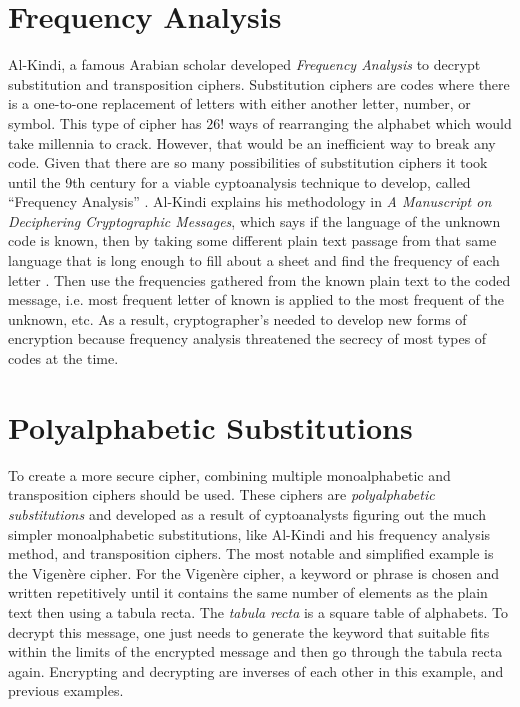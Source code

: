 \documentclass[12pt,letterpaper]{article} %
\begin{document}
\section{Frequency Analysis}
Al-Kindi, a famous Arabian scholar developed \emph{Frequency Analysis} to decrypt substitution and transposition ciphers.  Substitution ciphers are codes where 
there is a one-to-one replacement of letters with either another letter, number, or symbol. This type of cipher has $26!$ ways of rearranging the alphabet which would take millennia to crack.  However, that would be an inefficient way to break any code. 
Given that there are so many possibilities of substitution ciphers it took until the 9th century for a viable cyptoanalysis technique to develop, called “Frequency Analysis” \cite{Al-Tayeb}.  Al-Kindi  explains his methodology in \emph{A Manuscript on Deciphering Cryptographic Messages}, which says if the language of the unknown code is known, then by taking some different plain text passage from that same language that is long enough to fill about a sheet and find the frequency of each letter \cite{Al-Tayeb}.  Then use the frequencies gathered from the known plain text to the coded message, i.e. most frequent letter of known is applied to the most frequent of the unknown, etc.  
As a result, cryptographer’s needed to develop new forms of encryption because frequency analysis threatened the secrecy of most types of codes at the time.  

\section{Polyalphabetic Substitutions}
To create a more secure cipher, combining  multiple monoalphabetic and transposition ciphers should be used.  These ciphers are \emph{polyalphabetic substitutions} and developed as a result of cyptoanalysts figuring out the much simpler monoalphabetic substitutions, like Al-Kindi and his frequency analysis method, and transposition ciphers. The most notable and simplified example is the Vigenère cipher.  For the Vigenère cipher, a keyword or phrase is chosen and written repetitively until it contains the same number of elements as the plain text 
\cite{Crypto} then using a tabula recta.  The \emph{tabula recta} is a square table of alphabets. To decrypt this message, one just needs to generate the keyword that suitable fits within the limits of the encrypted message and then go through the tabula recta again. 
 Encrypting and decrypting are inverses of each other in this example, and previous examples.
\end{document}

